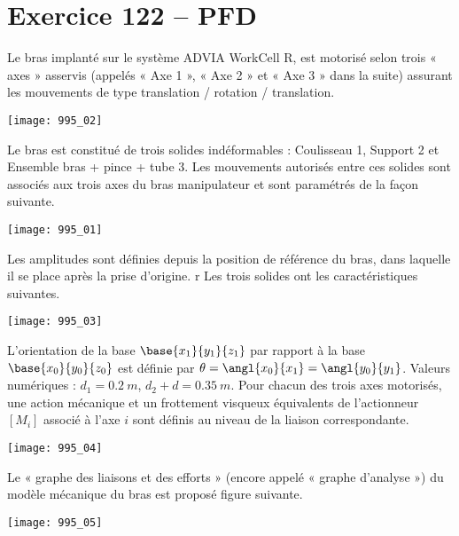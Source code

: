 \section*{Exercice 122 -- PFD}
\setcounter{exo}{0}

Le bras implanté sur le système ADVIA WorkCell R, est motorisé selon trois « axes » asservis (appelés « Axe 1 », « Axe 2 » et « Axe 3 » dans la suite) assurant les mouvements de type translation / rotation / translation.

\begin{center}
\texttt{[image: 995\_02]}
\end{center}


Le bras est constitué de trois solides indéformables : Coulisseau 1, Support 2 et Ensemble bras + pince +
tube 3. Les mouvements autorisés entre ces solides sont associés aux trois axes du bras manipulateur et sont
paramétrés de la façon suivante.

\begin{center}
\texttt{[image: 995\_01]}
\end{center}


Les amplitudes sont définies depuis la position de référence du bras, dans laquelle il se place après la prise
d’origine.
r
Les trois solides ont les caractéristiques suivantes.

\begin{center}
\texttt{[image: 995\_03]}
\end{center}

L’orientation de la base $\base{x_1}{y_1}{z_1}$ par rapport à la base $\base{x_0}{y_0}{z_0}$ est définie par $\theta  = \angl{x_0}{x_1} = \angl{y_0}{y_1}$.
Valeurs numériques : $d_1 = \SI{0,2}{m}$, $d_2 + d = \SI{0,35}{m}$.
Pour chacun des trois axes motorisés, une action mécanique et un frottement visqueux équivalents de l’actionneur
$\left[ M_i \right]$ associé à l’axe $i$ sont définis au niveau de la liaison correspondante.


\begin{center}
\texttt{[image: 995\_04]}
\end{center}

Le « graphe des liaisons et des efforts » (encore appelé « graphe d’analyse ») du modèle mécanique du bras est
proposé figure suivante.


\begin{center}
\texttt{[image: 995\_05]}
\end{center}


